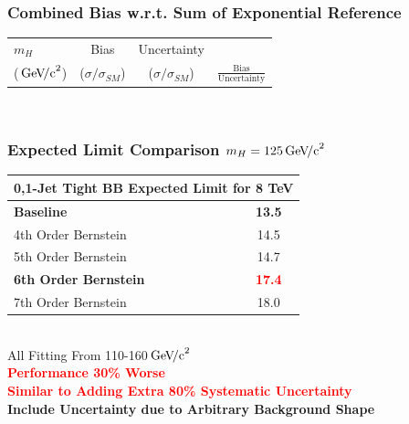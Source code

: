 \documentclass{beamer}
\newcommand{\GeVcc}{\ensuremath{\,\mathrm{Ge\kern -0.1em V\!/c}^2}}
\newcommand{\tredbf}[1]{\textcolor{red}{\bf #1}}
\begin{document}
\begin{frame}
\frametitle{Combined Bias w.r.t. Sum of Exponential Reference}
  \begin{center}
    \scriptsize
    \begin{tabular}{|l|c|c|c|} \hline
$m_H$         & Bias & Uncertainty & \\ 
(\GeVcc{})         & ($\sigma/\sigma_{SM}$) & ($\sigma/\sigma_{SM}$) & $\frac{\mathrm{Bias}}{\mathrm{Uncertainty}}$ \\ \hline \hline
    \end{tabular}
\\
  \small
  \end{center}
\end{frame}

\begin{frame}
\frametitle{Expected Limit Comparison $m_H=125\GeVcc{}$}
\begin{center}
\begin{tabular}{|l|c|} \hline
\multicolumn{2}{|c|}{ \bf 0,1-Jet Tight BB Expected Limit for 8 TeV} \\ \hline
\bf Baseline          &      \bf 13.5   \\ \hline
4th Order Bernstein         & 14.5        \\ \hline
5th Order Bernstein         & 14.7        \\ \hline
\bf 6th Order Bernstein         & \tredbf{17.4}        \\ \hline
7th Order Bernstein         & 18.0        \\ \hline
\end{tabular}
\\
All Fitting From 110-160\GeVcc{}
\\ \vspace{1em}
\large
\tredbf{
Performance 30\% Worse
\\
Similar to Adding Extra 80\% Systematic Uncertainty
}
\\
\textbf{Include Uncertainty due to Arbitrary Background Shape}
\end{center}
\end{frame}
\end{document}
